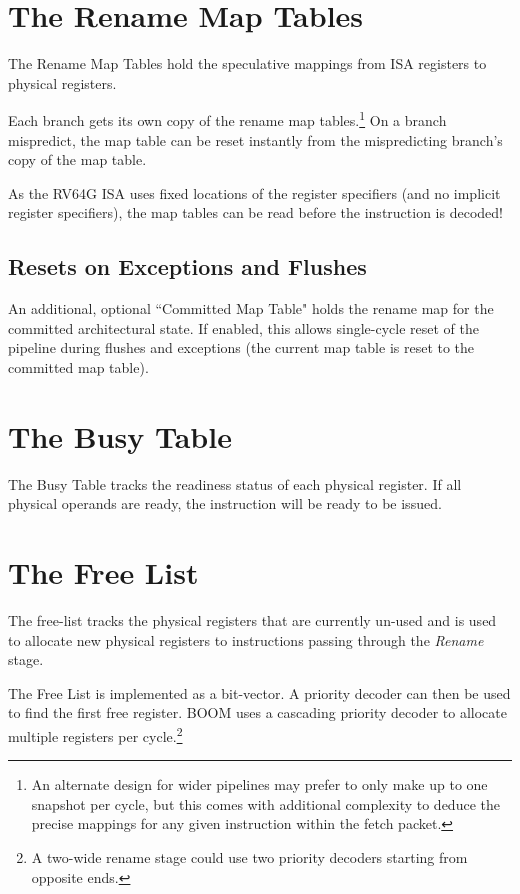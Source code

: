 \section{The Rename Map Tables}

The Rename Map Tables hold the speculative mappings from ISA registers to physical registers.  

Each branch gets its own copy of the rename map tables.\footnote{An alternate design for wider pipelines may prefer to only make up to one snapshot per cycle, but this comes with additional complexity to deduce the precise mappings for any given instruction within the fetch packet.}  On a branch mispredict, the map table can be reset instantly from the mispredicting branch's copy of the map table. 

As the RV64G ISA uses fixed locations of the register specifiers (and no implicit register specifiers), the map tables can be read before the instruction is decoded!  

\subsection{Resets on Exceptions and Flushes}


An additional, optional ``Committed Map Table" holds the rename map for the committed architectural state.  If enabled, this allows single-cycle reset of the pipeline during flushes and exceptions (the current map table is reset to the committed map table). 


\section{The Busy Table}

The Busy Table tracks the readiness status of each physical register. If all physical operands are ready, the instruction will be ready to be issued. 

\section{The Free List}

The free-list tracks the physical registers that are currently un-used and is used to allocate new physical registers to instructions passing through the {\em Rename} stage.  

The Free List is implemented as a bit-vector.  A priority decoder can then be used to find the first free register. BOOM uses a cascading priority decoder to allocate multiple registers per cycle.\footnote{A two-wide rename stage could use two priority decoders starting from opposite ends.}

